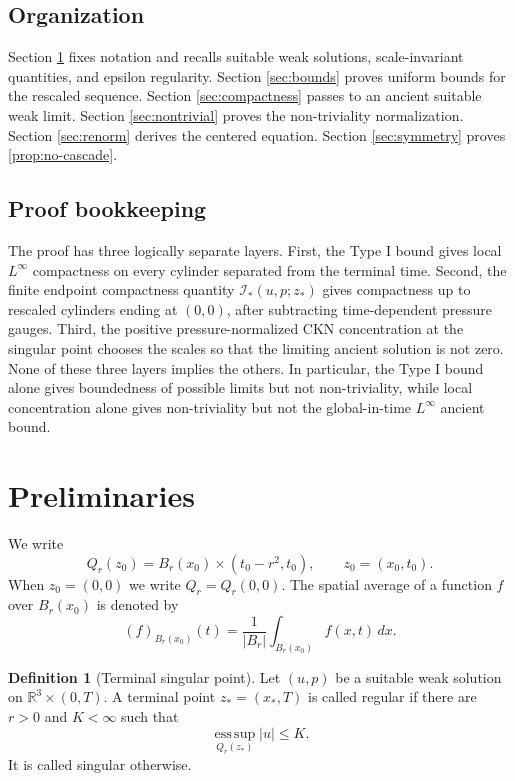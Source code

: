 \documentclass[11pt]{amsart}
\theoremstyle{plain}
\theoremstyle{definition}
\newtheorem{definition}[theorem]{Definition}
\theoremstyle{remark}
\numberwithin{equation}{section}
\newcommand{\R}{\mathbb R}
\newcommand{\esssup}{\operatorname*{ess\,sup}}
\newcommand{\calI}{\mathcal I}
\begin{document}
\subsection{Organization}

Section \ref{sec:prelim} fixes notation and recalls suitable weak solutions,
scale-invariant quantities, and epsilon regularity.  Section
\ref{sec:bounds} proves uniform bounds for the rescaled sequence.  Section
\ref{sec:compactness} passes to an ancient suitable weak limit.  Section
\ref{sec:nontrivial} proves the non-triviality normalization.  Section
\ref{sec:renorm} derives the centered equation.  Section \ref{sec:symmetry}
proves \cref{prop:no-cascade}.

\subsection{Proof bookkeeping}

The proof has three logically separate layers.  First, the Type I bound gives
local \(L^\infty\) compactness on every cylinder separated from the terminal
time.  Second, the finite endpoint compactness quantity
\(\calI_*(u,p;z_*)\) gives compactness up to rescaled cylinders ending at
\((0,0)\), after subtracting time-dependent pressure gauges.  Third, the
positive pressure-normalized CKN concentration at the singular point chooses
the scales so that the limiting ancient solution is not zero.  None of these
three layers implies the others.  In particular, the Type I bound alone gives
boundedness of possible limits but not non-triviality, while local
concentration alone gives non-triviality but not the global-in-time
\(L^\infty\) ancient bound.

\section{Preliminaries}\label{sec:prelim}

We write
\[
   Q_r(z_0)=B_r(x_0)\times(t_0-r^2,t_0),
   \qquad z_0=(x_0,t_0).
\]
When \(z_0=(0,0)\) we write \(Q_r=Q_r(0,0)\).  The spatial average of a
function \(f\) over \(B_r(x_0)\) is denoted by
\[
   (f)_{B_r(x_0)}(t)=\frac1{|B_r|}\int_{B_r(x_0)}f(x,t)\,dx.
\]

\begin{definition}[Terminal singular point]\label{def:terminal-singular}
Let \((u,p)\) be a suitable weak solution on \(\R^3\times(0,T)\).  A terminal
point \(z_*=(x_*,T)\) is called regular if there are \(r>0\) and
\(K<\infty\) such that
\[
   \esssup_{Q_r(z_*)}|u|\le K.
\]
It is called singular otherwise.
\end{definition}
\end{document}
